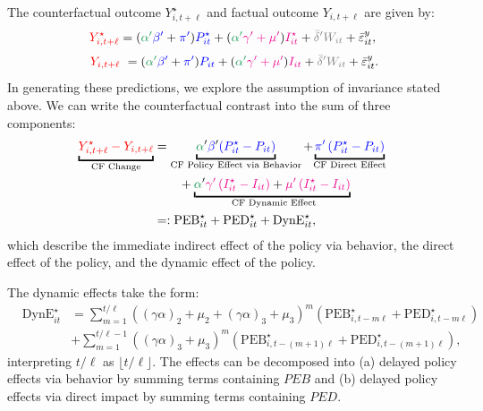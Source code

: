 \documentclass[11pt,reqno,letter]{amsart}
\theoremstyle{definition}
\def\bcolor{\color{ForestGreen}}
\def\pcolor{\color{blue}}
\def\icolor{\color{magenta}}
\def\wcolor{\color{gray}}
\def\ycolor{\color{red}}
\begin{document}
The counterfactual outcome $Y^\star_{i,t+\ell}$  and  factual outcome $Y_{i,t+\ell}$  are given by:
$$
 {\ycolor Y^\star_{i,t+\ell}} = ( {\bcolor\alpha '} {\pcolor \beta'}  + {\pcolor\pi'})
    {\pcolor P^\star_{it}} + ({\bcolor\alpha '}  {\icolor \gamma' + \mu'})
    {\icolor I^\star_{it} }+ {\wcolor \bar \delta 'W_{it}} + \bar \varepsilon_{it}^y, $$$$\ {\ycolor Y_{i,t+\ell}} \ =
    ( {\bcolor\alpha '}  {\pcolor \beta'} + {\pcolor\pi'})
    {\pcolor P_{it}} + ({\bcolor\alpha '}  {\icolor \gamma' + \mu'})
    {\icolor I_{it} }+ {\wcolor \bar \delta 'W_{it}} + \bar \varepsilon_{it}^y.
$$
In generating these predictions, we explore the assumption of invariance stated above.
We can write  the counterfactual contrast into the sum of three components:
  \begin{align}
 \underbracket{{\ycolor Y^\star_{i,t+\ell} -  Y_{i,t+\ell} }}_{\text{CF Change}} & =
\underbracket{{\bcolor\alpha}' {\pcolor\beta}' {\pcolor\left(P^\star_{it} - P_{it} \right)}}_{\text{CF Policy Effect via Behavior}}  +    {\underbracket{\pcolor\pi' \left( P^\star_{it} -  P_{it} \right)}_{\text{CF Direct  Effect}} } \nonumber\\
&\qquad +  {\underbracket{{\bcolor\alpha}' {\icolor{\gamma}'  \left( I^\star_{it} - I_{it} \right)}+ {\icolor{\mu}'  \left( I^\star_{it} -  I_{it} \right)}}_{\text{ CF Dynamic Effect}}} \nonumber \\
 & =:   \mathrm{PEB}^\star_{it} + \mathrm{PED}^\star_{it} + \mathrm{DynE}^\star_{it}, \label{eqn:DC2}
  \end{align}
 which describe the immediate indirect effect of the policy via behavior, the direct effect of the policy, and the dynamic effect
 of the policy.

The dynamic effects take the form:
$$
\begin{array}{lll}
  & \mathrm{DynE}^\star_{it} &=
  \sum_{m=1}^{t/\ell} \left( (\gamma \alpha)_2 + \mu_2+  (\gamma \alpha)_3+ \mu_3    \right)^m \left(\mathrm{PEB}^\star_{i,t-m \ell } +  \mathrm{PED}^\star_{i,t- m\ell} \right)
  \\
 &&  + \sum_{m=1}^{t/\ell-1} \left( (\gamma \alpha)_3 + \mu_3    \right)^m \left (\mathrm{PEB}^\star_{i,t-(m +1) \ell } +  \mathrm{PED}^\star_{i,t- (m+1)\ell}  \right),
 \end{array}
 $$
 interpreting $t/\ell$ as $\lfloor t/\ell \rfloor$.
 The effects can be decomposed into (a) delayed policy effects via behavior by
summing terms containing $PEB$ and (b) delayed policy effects via direct impact
by summing terms containing $PED$.
\end{document}
